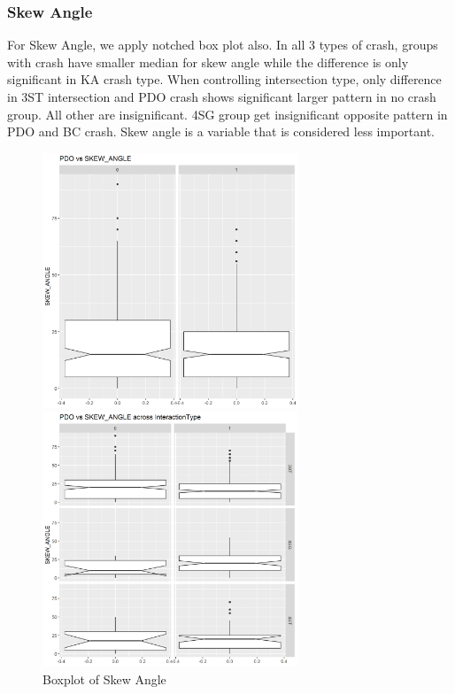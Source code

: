 \documentclass[11pt]{scrartcl} %
\begin{document}
\subsubsection{Skew Angle}

For Skew Angle, we apply notched box plot also. In all 3 types of crash, groups with crash have smaller median for skew angle while the difference is only significant in KA crash type. When controlling intersection type, only difference in 3ST intersection and PDO crash shows significant larger pattern in no crash group. All other are insignificant. 4SG group get insignificant opposite pattern in PDO and BC crash. Skew angle is a variable that is considered less important.

\begin{figure}[H]
\begin{minipage}[t]{0.5\linewidth}
\centering
\includegraphics[width=3in]{image/angle_all_pdo.png}
\small
\end{minipage}
\begin{minipage}[t]{0.5\linewidth}
\centering
\includegraphics[width=3in]{image/angle_pdo.png}
\small
\end{minipage}
\caption{Boxplot of Skew Angle}
\end{figure}
\end{document}
